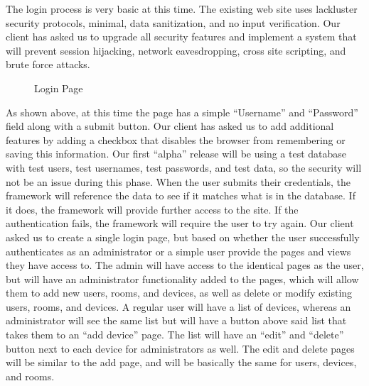 \documentclass{report}
\begin{document}
\indent
The login process is very basic at this time. The existing web site uses lackluster security protocols, minimal, data sanitization, and no input verification. Our client has asked us to upgrade all security features and implement a system that will prevent session hijacking, network eavesdropping, cross site scripting, and brute force attacks.

\begin{figure}[H]
	\caption{Login Page}
\end{figure}
\indent
As shown above, at this time the page has a simple “Username” and “Password” field along with a submit button. Our client has asked us to add additional features by adding a checkbox that disables the browser from remembering or saving this information. Our first “alpha” release will be using a test database with test users, test usernames, test passwords, and test data, so the security will not be an issue during this phase. When the user submits their credentials, the framework will reference the data to see if it matches what is in the database. If it does, the framework will provide further access to the site. If the authentication fails, the framework will require the user to try again. 
\newline
\indent
Our client asked us to create a single login page, but based on whether the user successfully authenticates as an administrator or a simple user provide the pages and views they have access to. The admin will have access to the identical pages as the user, but will have an administrator functionality added to the pages, which will allow them to add new users, rooms, and devices, as well as delete or modify existing users, rooms, and devices. A regular user will have a list of devices, whereas an administrator will see the same list but will have a button above said list that takes them to an “add device” page. The list will have an “edit” and “delete” button next to each device for administrators as well. The edit and delete pages will be similar to the add page, and will be basically the same for users, devices, and rooms.
\newpage
\end{document}
